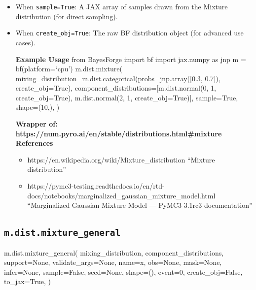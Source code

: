 \documentclass[
  letterpaper,
  DIV=11,
  numbers=noendperiod]{scrartcl}
\newenvironment{Shaded}{\begin{snugshade}}{\end{snugshade}}
\newcommand{\DecValTok}[1]{\textcolor[rgb]{0.68,0.00,0.00}{#1}}
\newcommand{\NormalTok}[1]{\textcolor[rgb]{0.00,0.23,0.31}{#1}}
\newcommand{\OperatorTok}[1]{\textcolor[rgb]{0.37,0.37,0.37}{#1}}
\newcommand{\StringTok}[1]{\textcolor[rgb]{0.13,0.47,0.30}{#1}}
\newcommand{\VariableTok}[1]{\textcolor[rgb]{0.07,0.07,0.07}{#1}}
\providecommand{\tightlist}{%
  \setlength{\itemsep}{0pt}\setlength{\parskip}{0pt}}\usepackage{longtable,booktabs,array}
\begin{document}
\begin{itemize}
\item
  When \texttt{sample=True}: A JAX array of samples drawn from the
  Mixture distribution (for direct sampling).
\item
  When \texttt{create\_obj=True}: The raw BF distribution object (for
  advanced use cases).

  \textbf{Example Usage} from BayesForge import bf import jax.numpy as
  jnp m = bf(platform=`cpu') m.dist.mixture(
  mixing\_distribution=m.dist.categorical(probs=jnp.array({[}0.3,
  0.7{]}), create\_obj=True),
  component\_distributions={[}m.dist.normal(0, 1, create\_obj=True),
  m.dist.normal(2, 1, create\_obj=True){]}, sample=True, shape=(10,), )

  \textbf{Wrapper of:
  https://num.pyro.ai/en/stable/distributions.html\#mixture}
  \textbf{References}

  \begin{itemize}
  \tightlist
  \item
    https://en.wikipedia.org/wiki/Mixture\_distribution ``Mixture
    distribution''
  \item
    https://pymc3-testing.readthedocs.io/en/rtd-docs/notebooks/marginalized\_gaussian\_mixture\_model.html
    ``Marginalized Gaussian Mixture Model --- PyMC3 3.1rc3
    documentation''
  \end{itemize}
\end{itemize}

\subsection{\texorpdfstring{\texttt{m.dist.mixture\_general}}{m.dist.mixture\_general}}\label{mixture_general}

\begin{Shaded}
\begin{Highlighting}[]
\NormalTok{m.dist.mixture\_general(}
\NormalTok{    mixing\_distribution,}
\NormalTok{    component\_distributions,}
\NormalTok{    support}\OperatorTok{=}\VariableTok{None}\NormalTok{,}
\NormalTok{    validate\_args}\OperatorTok{=}\VariableTok{None}\NormalTok{,}
\NormalTok{    name}\OperatorTok{=}\StringTok{\textquotesingle{}x\textquotesingle{}}\NormalTok{,}
\NormalTok{    obs}\OperatorTok{=}\VariableTok{None}\NormalTok{,}
\NormalTok{    mask}\OperatorTok{=}\VariableTok{None}\NormalTok{,}
\NormalTok{    infer}\OperatorTok{=}\VariableTok{None}\NormalTok{,}
\NormalTok{    sample}\OperatorTok{=}\VariableTok{False}\NormalTok{,}
\NormalTok{    seed}\OperatorTok{=}\VariableTok{None}\NormalTok{,}
\NormalTok{    shape}\OperatorTok{=}\NormalTok{(),}
\NormalTok{    event}\OperatorTok{=}\DecValTok{0}\NormalTok{,}
\NormalTok{    create\_obj}\OperatorTok{=}\VariableTok{False}\NormalTok{,}
\NormalTok{    to\_jax}\OperatorTok{=}\VariableTok{True}\NormalTok{,}
\NormalTok{)}
\end{Highlighting}
\end{Shaded}
\end{document}
